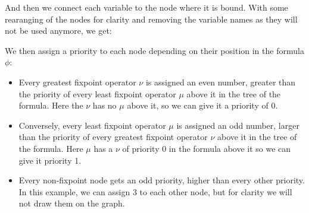 And then we connect each variable to the node where it is bound.
With some rearanging of the nodes for clarity and removing the variable names
as they will not be used anymore, we get:

\begin{center}
\end{center}

We then assign a priority to each node depending on their position in the formula $\phi$:
\begin{itemize}
    \item Every greatest fixpoint operator $\nu$ is assigned an even number,
        greater than the priority of every least fixpoint operator $\mu$
        above it in the tree of the formula.
        Here the $\nu$ has no $\mu$ above it, so we can give it
        a priority of $0$.
    \item Conversely, every least fixpoint operator $\mu$ is assigned an odd number,
        larger than the priority of every greatest fixpoint operator $\nu$
        above it in the tree of the formula.
        Here $\mu$ has a $\nu$ of priority 0 in the formula above it
        so we can give it priority 1.
    \item Every non-fixpoint node gets an odd priority, higher than every other priority.
        In this example, we can assign $3$ to each other node, but for clarity
        we will not draw them on the graph.
\end{itemize}

\begin{center}
\end{center}

